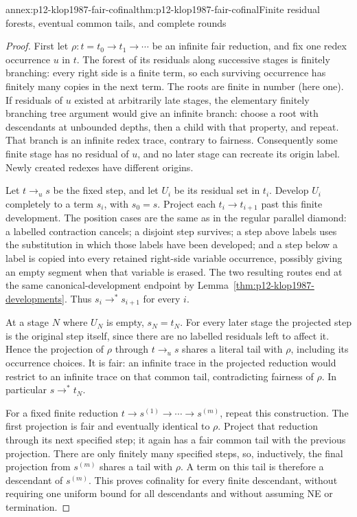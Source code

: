 \begin{annexitem}{annex:p12-klop1987-fair-cofinal}{thm:p12-klop1987-fair-cofinal}{Finite residual forests, eventual common tails, and complete rounds}
\begin{proof}
First let \(\rho:t=t_0\to t_1\to\cdots\) be an infinite fair
reduction, and fix one redex occurrence \(u\) in \(t\).
The forest of its residuals along successive stages is finitely branching:
every right side is a finite term, so each surviving occurrence has
finitely many copies in the next term. The roots are finite in number
(here one). If residuals of \(u\) existed at arbitrarily late stages,
the elementary finitely branching tree argument would give an infinite
branch: choose a root with descendants at unbounded depths, then a child
with that property, and repeat. That branch is an infinite redex trace,
contrary to fairness. Consequently some finite stage has no residual of
\(u\), and no later stage can recreate its origin label. Newly created
redexes have different origins.

Let \(t\to_u s\) be the fixed step, and let \(U_i\) be its
residual set in \(t_i\). Develop \(U_i\) completely to a term
\(s_i\), with \(s_0=s\). Project each \(t_i\to t_{i+1}\)
past this finite development. The position cases are the same as in
the regular parallel diamond: a labelled contraction cancels; a disjoint
step survives; a step above labels uses the substitution in which those
labels have been developed; and a step below a label is copied into
every retained right-side variable occurrence, possibly giving an empty
segment when that variable is erased. The two resulting routes end at
the same canonical-development endpoint by
Lemma~\ref{thm:p12-klop1987-developments}. Thus
\(s_i\to^*s_{i+1}\) for every \(i\).

At a stage \(N\) where \(U_N\) is empty, \(s_N=t_N\).
For every later stage the projected step is the original step itself,
since there are no labelled residuals left to affect it. Hence the
projection of \(\rho\) through \(t\to_u s\) shares a literal
tail with \(\rho\), including its occurrence choices. It is fair:
an infinite trace in the projected reduction would restrict to an
infinite trace on that common tail, contradicting fairness of \(\rho\).
In particular \(s\to^*t_N\).

For a fixed finite reduction
\(t\to s^{(1)}\to\cdots\to s^{(m)}\), repeat this construction.
The first projection is fair and eventually identical to \(\rho\).
Project that reduction through its next specified step; it again has
a fair common tail with the previous projection. There are only
finitely many specified steps, so, inductively, the final projection
from \(s^{(m)}\) shares a tail with \(\rho\). A term on this
tail is therefore a descendant of \(s^{(m)}\). This proves cofinality
for every finite descendant, without requiring one uniform bound for
all descendants and without assuming NE or termination.


\end{proof}
\end{annexitem}
